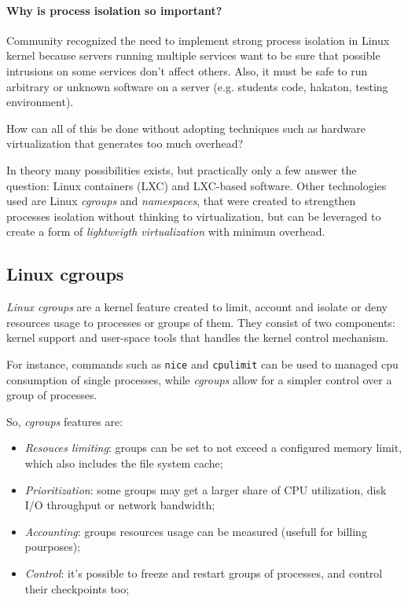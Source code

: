 \paragraph{Why is process isolation so important?}
Community recognized the need to implement strong process isolation in Linux
kernel because servers running multiple services want to be sure that possible
intrusions on some services don't affect others. Also, it must be safe to run
arbitrary or unknown software on a server (e.g. students code, hakaton, testing
environment).

\bigskip\noindent
How can all of this be done without adopting techniques such as hardware
virtualization that generates too much overhead?

In theory many possibilities exists, but practically only a few answer the
question: Linux containers (LXC) and LXC-based software. Other technologies
used are Linux \emph{cgroups} and \emph{namespaces}, that were created to
strengthen processes isolation without thinking to virtualization, but can be
leveraged to create a form of \emph{lightweigth virtualization} with minimun
overhead.

\subsection{Linux cgroups}
\emph{Linux cgroups} are a kernel feature created to limit, account and isolate
or deny resources usage to processes or groups of them. They consist of two
components: kernel support and user-space tools that handles the kernel control
mechanism.

For instance, commands such as \texttt{nice} and \texttt{cpulimit} can be used
to managed cpu consumption of single processes, while \emph{cgroups} allow for
a simpler control over a group of processes.

So, \emph{cgroups} features are:
\begin{itemize}
    \item \emph{Resouces limiting}: groups can be set to not exceed a configured
    memory limit, which also includes the file system cache;
    \item \emph{Prioritization}: some groups may get a larger share of CPU
    utilization, disk I/O throughput or network bandwidth;
    \item \emph{Accounting}: groups resources usage can be measured (usefull
    for billing pourposes);
    \item \emph{Control}: it's possible to freeze and restart groups of
    processes, and control their checkpoints too;
\end{itemize}

